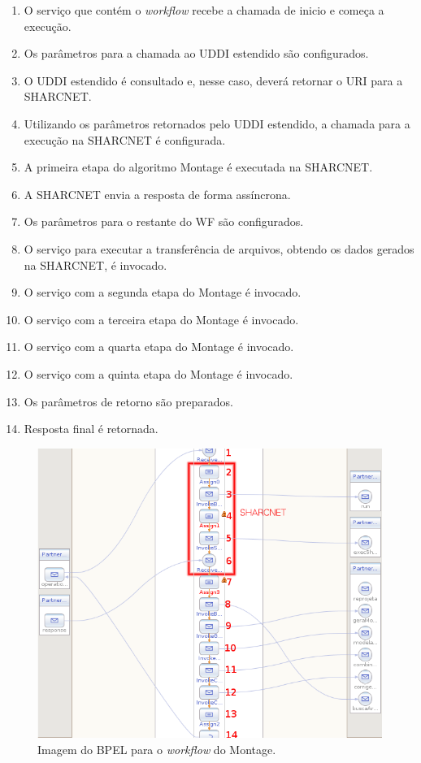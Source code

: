 \documentclass[12pt]{report} %
\begin{document}
	\begin{enumerate}
	 \item O serviço que contém o \textit{workflow} recebe a chamada de inicio e começa a execução.
	 \item Os parâmetros para a chamada ao UDDI estendido são configurados.
	 \item O UDDI estendido é consultado e, nesse caso, deverá retornar o URI para a SHARCNET.	
	 \item Utilizando os parâmetros retornados pelo UDDI estendido, a chamada para a execução na SHARCNET é configurada.
	 \item A primeira etapa do algoritmo Montage é executada na SHARCNET.
	 \item A SHARCNET envia a resposta de forma assíncrona.
	 \item Os parâmetros para o restante do WF são configurados.
	 \item O serviço para executar a transferência de arquivos, obtendo os dados gerados na SHARCNET, é invocado.
	 \item O serviço com a segunda etapa do Montage é invocado.
	 \item O serviço com a terceira etapa do Montage é invocado.
	 \item O serviço com a quarta etapa do Montage é invocado.
	 \item O serviço com a quinta etapa do Montage é invocado.
	 \item Os parâmetros de retorno são preparados.
	 \item Resposta final é retornada.
	\end{enumerate}
	
	\begin{figure}[!htb]%
	    \begin{center}
		\includegraphics[scale=0.6]{imagens/ImM101BPEL.png}
		\caption{Imagem do BPEL para o \textit{workflow} do Montage.}
		\label{fig:ImM101BPEL}
	    \end{center}
	\end{figure}
	
\end{document}
